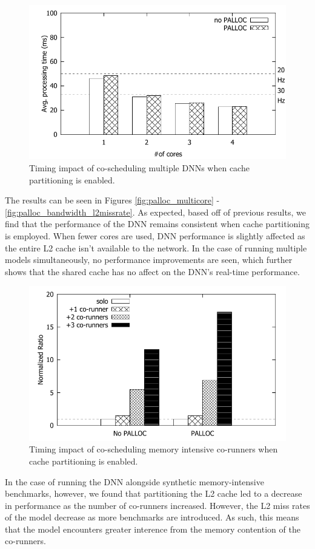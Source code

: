 \begin{figure}[h]
  \centering
  \includegraphics[width=.7\textwidth]{figs/palloc_multicore}
  \caption{Timing impact of co-scheduling multiple DNNs when cache 
partitioning is enabled.}
  \label{fig:palloc_multimodel}
\end{figure}

The results can be seen in Figures \ref{fig:palloc_multicore} - 
\ref{fig:palloc_bandwidth_l2missrate}. As 
expected, based off of previous results, we find that the performance 
of the DNN remains consistent when cache partitioning is employed. 
When fewer cores are used, DNN performance is slightly affected as 
the entire L2 cache isn't available to the network. In the case of 
running multiple models simultaneously, no performance improvements 
are seen, which further shows that the shared cache has no affect on 
the DNN's real-time performance.

\begin{figure}[h]
  \centering
  \includegraphics[width=.7\textwidth]{figs/palloc_bandwidth_exectime}
  \caption{Timing impact of co-scheduling memory intensive co-runners 
when cache partitioning is enabled.}
  \label{fig:palloc_bandwidth_exectime}
\end{figure}

In the case of running the DNN alongside synthetic memory-intensive 
benchmarks, however, we found that partitioning the L2 cache led to a 
decrease in performance as the number of co-runners increased. 
However, the L2 miss rates of the model decrease as more benchmarks 
are introduced. As such, this means that the model encounters greater 
interence from the memory contention of the co-runners.


